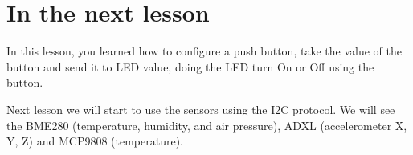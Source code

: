 \documentclass[10pt,twoside,english]{_support/latex/sbabook/sbabook}
\begin{document}
\section{In the next lesson}
In this lesson, you learned how to configure a push button, take the value of the button and send it to LED value, doing the LED turn On or Off using the button.

Next lesson we will start to use the sensors using the I2C protocol. We will see the BME280 (temperature, humidity, and air pressure), ADXL (accelerometer X, Y, Z) and MCP9808 (temperature).


\backmatter

\end{document}
